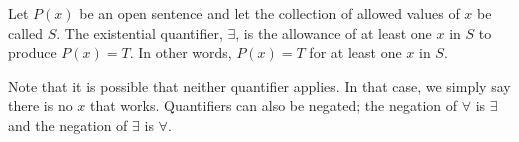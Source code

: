 \begin{definition}{}
    Let $P(x)$ be an open sentence and let the collection of allowed values of $x$ be called $S$. The existential quantifier, $\exists$, is the allowance of at least one $x$ in $S$ to produce $P(x)=T$. In other words, $P(x)=T$ for at least one $x$ in $S$.
\end{definition}

Note that it is possible that neither quantifier applies. In that case, we simply say there is no $x$ that works. Quantifiers can also be negated; the negation of $\forall$ is $\exists$ and the negation of $\exists$ is $\forall$.
